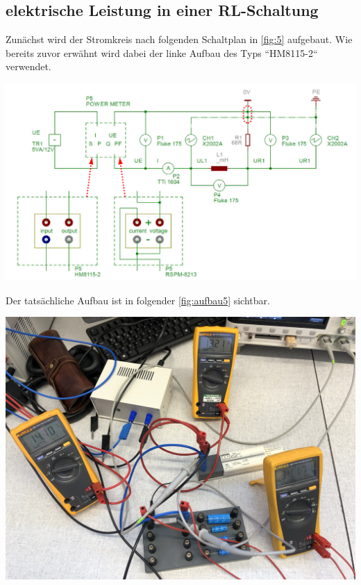 \documentclass[11pt,ngerman]{scrartcl}
\begin{document}
\subsection{elektrische Leistung in einer RL-Schaltung}

Zunächst wird der Stromkreis nach folgenden Schaltplan in \autoref{fig:5} aufgebaut. Wie bereits zuvor erwähnt wird dabei der linke Aufbau des Typs ``HM8115-2`` verwendet.

\begin{center}
	\begin{minipage}[t]{0.8\textwidth}
		\includegraphics[width=\textwidth]{skizze_5}
		\label{fig:5}
	\end{minipage}
\end{center}

\noindent Der tatsächliche Aufbau ist in folgender \autoref{fig:aufbau5} sichtbar.

\begin{center}
	\begin{minipage}[t]{0.7\textwidth}
		\includegraphics[width=\textwidth]{aufbau5}
		\label{fig:aufbau5}
	\end{minipage}
\end{center}
\end{document}
